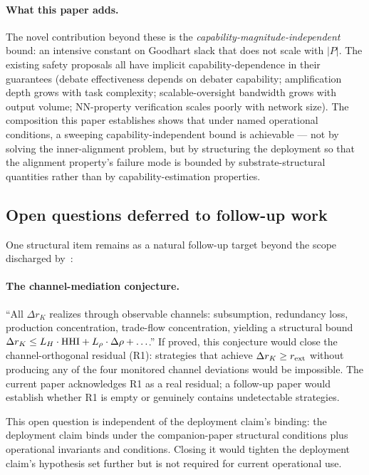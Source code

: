 \paragraph{What this paper adds.}
The novel contribution beyond these is the
\emph{capability-magnitude-independent} bound: an intensive
constant on Goodhart slack that does not scale with $|P|$.  The
existing safety proposals all have implicit capability-dependence
in their guarantees (debate effectiveness depends on debater
capability; amplification depth grows with task complexity;
scalable-oversight bandwidth grows with output volume; NN-property
verification scales poorly with network size).  The composition
this paper establishes shows that under named operational
conditions, a sweeping capability-independent bound is achievable
--- not by solving the inner-alignment problem, but by structuring
the deployment so that the alignment property's failure mode is
bounded by substrate-structural quantities rather than by
capability-estimation properties.

\subsection{Open questions deferred to follow-up work}
\label{sec:disc_companion}

One structural item remains as a natural follow-up target beyond
the scope discharged by~\citep{lasser2026foundations}:

\paragraph{The channel-mediation conjecture.}
``All $\Delta r_K$ realizes through observable channels:
subsumption, redundancy loss, production concentration, trade-flow
concentration, yielding a structural bound $\Delta r_K \leq L_H
\cdot \mathrm{HHI} + L_\rho \cdot \Delta\rho + \ldots$.''  If proved, this
conjecture would close the channel-orthogonal residual (R1):
strategies that achieve $\Delta r_K \geq r_{\mathrm{ext}}$ without producing
any of the four monitored channel deviations would be impossible.
The current paper acknowledges R1 as a real residual; a follow-up
paper would establish whether R1 is empty or genuinely contains
undetectable strategies.

This open question is independent of the deployment claim's
binding: the deployment claim binds under the companion-paper
structural conditions plus operational invariants and conditions.
Closing it would tighten the deployment claim's hypothesis set
further but is not required for current operational use.

